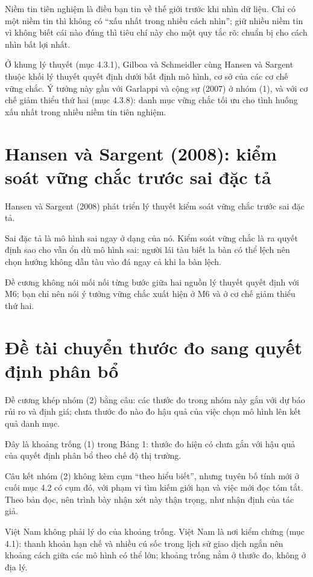 Niềm tin tiên nghiệm là điều bạn tin về thế giới trước khi nhìn dữ liệu. Chỉ có một niềm tin thì không có “xấu nhất trong nhiều cách nhìn”; giữ nhiều niềm tin vì không biết cái nào đúng thì tiêu chí này cho một quy tắc rõ: chuẩn bị cho cách nhìn bất lợi nhất.

Ở khung lý thuyết (mục 4.3.1), Gilboa và Schmeidler cùng Hansen và Sargent thuộc khối lý thuyết quyết định dưới bất định mô hình, cơ sở của các cơ chế vững chắc. Ý tưởng này gần với Garlappi và cộng sự (2007) ở nhóm (1), và với cơ chế giảm thiểu thứ hai (mục 4.3.8): danh mục vững chắc tối ưu cho tình huống xấu nhất trong nhiều niềm tin tiên nghiệm.

\section{Hansen và Sargent (2008): kiểm soát vững chắc trước sai đặc tả}

Hansen và Sargent (2008) phát triển lý thuyết kiểm soát vững chắc trước sai đặc tả.

Sai đặc tả là mô hình sai ngay ở dạng của nó. Kiểm soát vững chắc là ra quyết định sao cho vẫn ổn dù mô hình sai: người lái tàu biết la bàn có thể lệch nên chọn hướng không dẫn tàu vào đá ngay cả khi la bàn lệch.

Đề cương không nói mối nối từng bước giữa hai nguồn lý thuyết quyết định với M6; bạn chỉ nên nói ý tưởng vững chắc xuất hiện ở M6 và ở cơ chế giảm thiểu thứ hai.

\section{Đề tài chuyển thước đo sang quyết định phân bổ}

Đề cương khép nhóm (2) bằng câu: các thước đo trong nhóm này gắn với dự báo rủi ro và định giá; chưa thước đo nào đo hậu quả của việc chọn mô hình lên kết quả danh mục.

Đây là khoảng trống (1) trong Bảng 1: thước đo hiện có chưa gắn với hậu quả của quyết định phân bổ theo chế độ thị trường.

Câu kết nhóm (2) không kèm cụm “theo hiểu biết”, nhưng tuyên bố tính mới ở cuối mục 4.2 có cụm đó, với phạm vi tìm kiếm giới hạn và việc mới đọc tóm tắt. Theo bản đọc, nên trình bày nhận xét này thận trọng, như nhận định của tác giả.

Việt Nam không phải lý do của khoảng trống. Việt Nam là nơi kiểm chứng (mục 4.1): thanh khoản hạn chế và nhiều cú sốc trong lịch sử giao dịch ngắn nên khoảng cách giữa các mô hình có thể lớn; khoảng trống nằm ở thước đo, không ở địa lý.

